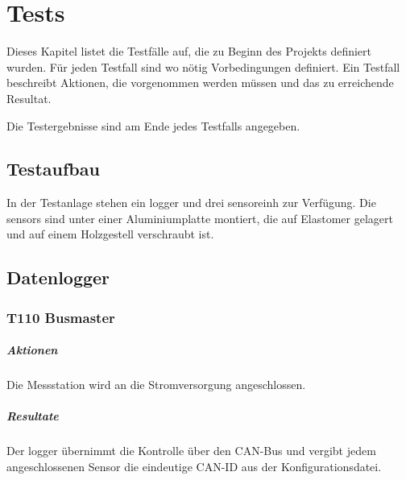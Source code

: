 %
%


\chapter{Tests}\label{chap.tests}

Dieses Kapitel listet die Testfälle auf, die zu Beginn des Projekts definiert wurden. Für jeden Testfall sind wo nötig Vorbedingungen definiert. Ein Testfall beschreibt Aktionen, die vorgenommen werden müssen und das zu erreichende Resultat.

Die Testergebnisse sind am Ende jedes Testfalls angegeben.

\section{Testaufbau}
In der Testanlage stehen ein \gls{logger} und drei \gls{sensoreinh} zur Verfügung. Die \glspl{sensor} sind unter einer Aluminiumplatte montiert, die auf Elastomer gelagert und auf einem Holzgestell verschraubt ist.


\section{Datenlogger}
\subsection{T110 Busmaster}
\paragraph{Aktionen} Die Messstation wird an die Stromversorgung angeschlossen.

\paragraph{Resultate} Der \gls{logger} übernimmt die Kontrolle über den CAN-Bus und vergibt jedem angeschlossenen Sensor die eindeutige CAN-ID aus der Konfigurationsdatei.

